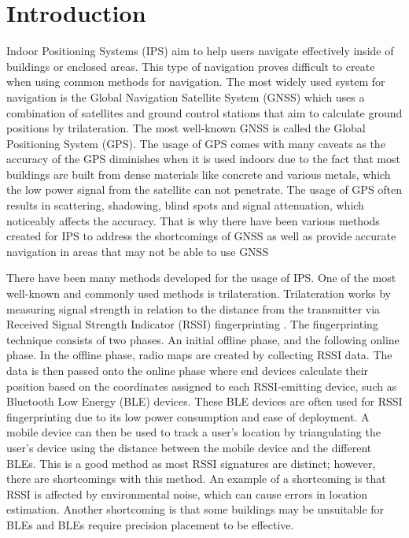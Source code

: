 \documentclass[conference]{IEEEtran}
\begin{document}
	\section{Introduction}
	Indoor Positioning Systems (IPS) aim to help users navigate effectively inside of buildings or enclosed areas. This type of navigation proves difficult to create when using common methods for navigation. The most widely used system for navigation is the Global Navigation Satellite System (GNSS) which uses a combination of satellites and ground control stations that aim to calculate ground positions by trilateration. The most well-known GNSS is called the Global Positioning System (GPS). The usage of GPS comes with many caveats as the accuracy of the GPS diminishes when it is used indoors due to the fact that most buildings are built from dense materials like concrete and various metals, which the low power signal from the satellite can not penetrate. The usage of GPS often results in scattering, shadowing, blind spots and signal attenuation, which noticeably affects the accuracy\cite{bgp1}. That is why there have been various methods created for IPS to address the shortcomings of GNSS as well as provide accurate navigation in areas that may not be able to use GNSS
	
	There have been many methods developed for the usage of IPS. One of the most well-known and commonly used methods is trilateration. Trilateration works by measuring signal strength in relation to the distance from the transmitter via Received Signal Strength Indicator (RSSI) fingerprinting \cite{bg2}. The fingerprinting technique consists of two phases. An initial offline phase, and the following online phase. In the offline phase, radio maps are created by collecting RSSI data. The data is then passed onto the online phase where end devices calculate their position based on the coordinates assigned to each RSSI-emitting device, such as Bluetooth Low Energy (BLE) devices. These BLE devices are often used for RSSI fingerprinting due to its low power consumption and ease of deployment. A mobile device can then be used to track a user's location by triangulating the user's device using the distance between the mobile device and the different BLEs. This is a good method as most RSSI signatures are distinct; however, there are shortcomings with this method. An example of a shortcoming is that RSSI is affected by environmental noise, which can cause errors in location estimation\cite{bgp2}. Another shortcoming is that some buildings may be unsuitable for BLEs and BLEs require precision placement to be effective.
	
\end{document}

